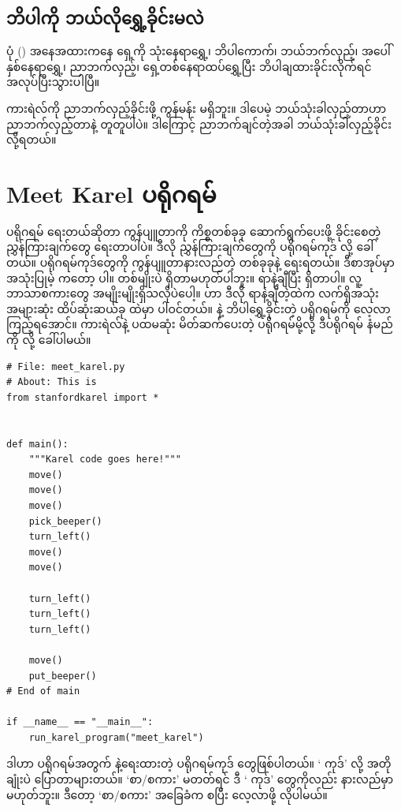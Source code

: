 \subsection*{ဘိပါကို ဘယ်လိုရွှေ့ခိုင်းမလဲ}
ပုံ (\fRefNo{\ref{fig:meet_karel_1}}) အနေအထားကနေ ရှေ့ကို သုံးနေရာရွှေ့၊ ဘိပါကောက်၊ ဘယ်ဘက်လှည့်၊ အပေါ် နှစ်နေရာရွှေ့၊ ညာဘက်လှည့်၊ ရှေ့တစ်နေရာထပ်ရွှေ့ပြီး ဘိပါချထားခိုင်းလိုက်ရင် အလုပ်ပြီးသွားပါပြီ။

ကားရဲလ်ကို ညာဘက်လှည့်ခိုင်းဖို့  ကွန်မန်း မရှိဘူး။ ဒါပေမဲ့ ဘယ်သုံးခါလှည့်တာဟာ ညာဘက်လှည့်တာနဲ့ တူတူပါပဲ။ ဒါကြောင့် ညာဘက်ချင်တဲ့အခါ ဘယ်သုံးခါလှည့်ခိုင်းလို့ရတယ်။

\section{Meet Karel ပရိုဂရမ်}
ပရိုဂရမ် ရေးတယ်ဆိုတာ ကွန်ပျူတာကို ကိစ္စတစ်ခုခု ဆောက်ရွက်ပေးဖို့ ခိုင်းစေတဲ့  ညွှန်ကြားချက်တွေ ရေးတာပါပဲ။ ဒီလို ညွှန်ကြားချက်တွေကို ပရိုဂရမ်ကုဒ်  လို့ ခေါ်တယ်။ ပရိုဂရမ်ကုဒ်တွေကို ကွန်ပျူတာနားလည်တဲ့  တစ်ခုခုနဲ့ ရေးရတယ်။ ဒီစာအုပ်မှာ အသုံးပြုမဲ့  ကတော့  ပါ။  တစ်မျိုးပဲ ရှိတာမဟုတ်ပါဘူး။ ရာနဲ့ချီပြီး ရှိတာပါ။ လူ့ဘာသာစကားတွေ အမျိုးမျိုးရှိသလိုပဲပေါ့။  ဟာ ဒီလို ရာနဲ့ချီတဲ့ထဲက လက်ရှိအသုံးအများဆုံး ထိပ်ဆုံးဆယ်ခု ထဲမှာ ပါဝင်တယ်။  နဲ့ ဘိပါရွှေ့ခိုင်းတဲ့ ပရိုဂရမ်ကို လေ့လာကြည့်ရအောင်။ ကားရဲလ်နဲ့ ပထမဆုံး မိတ်ဆက်ပေးတဲ့ ပရိုဂရမ်မို့လို့ ဒီပရိုဂရမ် နံမည်ကို  လို့ ခေါ်ပါမယ်။
%
\setlength{\fboxsep}{0pt}
\begin{verbatim}
# File: meet_karel.py
# About: This is
from stanfordkarel import *


def main():
    """Karel code goes here!"""
    move()
    move()
    move()
    pick_beeper()
    turn_left()
    move()
    move()

    turn_left()
    turn_left()
    turn_left()

    move()
    put_beeper()
# End of main

if __name__ == "__main__":
    run_karel_program("meet_karel")

\end{verbatim}
%

ဒါဟာ  ပရိုဂရမ်အတွက်  နဲ့ရေးထားတဲ့ ပရိုဂရမ်ကုဒ် တွေဖြစ်ပါတယ်။ ‘ ကုဒ်’ လို့ အတိုချုံးပဲ ပြောတာများတယ်။  ‘စာ/စကား’ မတတ်ရင် ဒီ ‘ ကုဒ်’ တွေကိုလည်း နားလည်မှာ မဟုတ်ဘူး။ ဒီတော့  ‘စာ/စကား’ အခြေခံက စပြီး လေ့လာဖို့ လိုပါမယ်။

